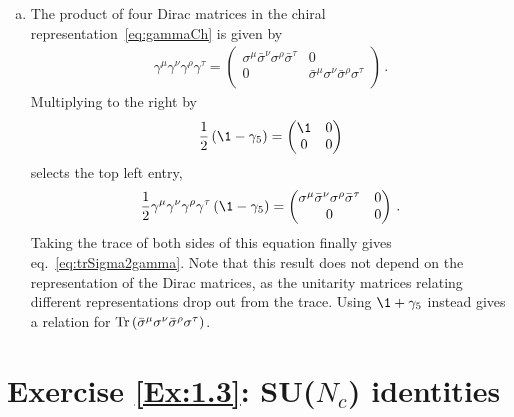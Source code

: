 \begin{enumerate}[a)]
\smallskip
\item The product of four Dirac matrices in the chiral representation~\eqref{eq:gammaCh} is given by
\begin{align}
\gamma^{\mu} \gamma^{\nu} \gamma^{\rho} \gamma^{\tau} 
         = \begin{pmatrix} \sigma^{\mu} \bar{\sigma}^{\nu} \sigma^{\rho} \bar{\sigma}^{\tau} & 0 \\ 0 & \bar{\sigma}^{\mu} \sigma^{\nu} \bar{\sigma}^{\rho}  \sigma^{\tau} \\ \end{pmatrix} \,.
\end{align}
Multiplying to the right by
\begin{align}
\frac{1}{2} \left( \1 - \gamma_5 \right) = \begin{pmatrix} \1 & 0 \\ 0 & 0 \\ \end{pmatrix} 
\end{align}
selects the top left entry,
\begin{align}
\frac{1}{2}  \gamma^{\mu} \gamma^{\nu} \gamma^{\rho} \gamma^{\tau}  \left( \1 - \gamma_5 \right)  = \begin{pmatrix} \sigma^{\mu} \bar{\sigma}^{\nu} \sigma^{\rho} \bar{\sigma}^{\tau} & 0 \\ 0 & 0 \\ \end{pmatrix} \,.
\end{align}
Taking the trace of both sides of this equation finally gives eq.~\eqref{eq:trSigma2gamma}. Note that this result does not depend on the representation of the Dirac matrices, as the unitarity matrices relating different representations drop out from the trace. Using $\1+\gamma_5$ instead gives a relation for $\mathop{\mathrm{Tr}}\left(\bar{\sigma}^{\mu} \sigma^{\nu} \bar{\sigma}^{\rho} \sigma^{\tau}\right)$.  


\end{enumerate}


\section*{Exercise \ref{Ex:1.3}: SU($N_c$) identities}
\label{Sol:1.3}

